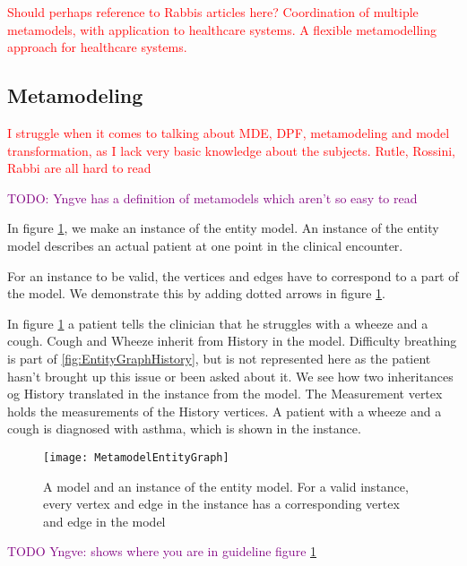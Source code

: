 \textcolor{red}{Should perhaps reference to Rabbis articles here? 
	Coordination	of multiple metamodels, with application	to healthcare systems.
A flexible metamodelling approach for healthcare systems. }

\subsection{Metamodeling}

\textcolor{red}{I struggle when it comes to talking about MDE, DPF, metamodeling and model transformation, as I lack very basic knowledge about the subjects. Rutle, Rossini, Rabbi are all hard to read}

\textcolor{purple}{TODO: Yngve has a definition of metamodels which aren't so easy to read}

In figure \ref{fig:MetamodelEntityGraph}, we make an instance of the entity model. An instance of the entity model describes an actual patient at one point in the clinical encounter. 

For an instance to be valid, the vertices and edges have to correspond to a part of the model. We demonstrate this by adding dotted arrows in figure \ref{fig:MetamodelEntityGraph}. 

In figure \ref{fig:MetamodelEntityGraph} a patient tells the clinician that he struggles with a wheeze and a cough. Cough and Wheeze inherit from History in the model. Difficulty breathing is part of \ref{fig:EntityGraphHistory}, but is not represented here as the patient hasn't brought up this issue or been asked about it. We see how two inheritances og History translated in the instance from the model. The Measurement vertex holds the measurements of the History vertices. A patient with a wheeze and a cough is diagnosed with asthma, which is shown in the instance.

\begin{figure}[h!]
	\label{fig:MetamodelEntityGraph}
	\texttt{[image: MetamodelEntityGraph]}
	\caption {A model and an instance of the entity model. For a valid instance, every vertex and edge in the instance has a corresponding vertex and edge in the model}
\end{figure}

\textcolor{purple}{TODO Yngve: shows where you are in guideline figure \ref{fig:MetamodelEntityGraph}}

